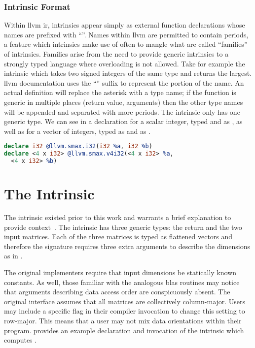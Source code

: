 \documentclass[\main/thesis.tex]{subfiles}
\begin{document}
\subsubsection{Intrinsic Format}
Within \gls{llvm} \gls{ir}, \glspl{intrinsic} appear simply as external function declarations whose names are prefixed with ``''.
Names within \gls{llvm} are permitted to contain periods, a feature which \glspl{intrinsic} make use of often to mangle what are called ``families'' of \glspl{intrinsic}.
Families arise from the need to provide generic \glspl{intrinsic} to a strongly typed language where overloading is not allowed.
Take for example the  \gls{intrinsic} which takes two signed integers of the same type and returns the largest.
\Gls{llvm} documentation uses the ``'' suffix to represent the  portion of the name.
An actual definition will replace the asterisk with a type name; if the function is generic in multiple places (return value, arguments) then the other type names will be appended and separated with more periods.
The  \gls{intrinsic} only has one generic type.
We can see in  a declaration for a scalar integer, typed and  as , as well as for a vector of integers, typed as  and  as .

\begin{lstlisting}[caption={[Inrinsic Declarations]A set of basic intrinsic declarations~\autocite{llvmLangref}.},
      label=lst:intrinsics,numbers=none,language=llvm,float]
declare i32 @llvm.smax.i32(i32 %a, i32 %b)
declare <4 x i32> @llvm.smax.v4i32(<4 x i32> %a,
  <4 x i32> %b)
\end{lstlisting}

\section{The \texorpdfstring{}{llvm.matrix.multiply.*} Intrinsic}
The  \gls{intrinsic} existed prior to this work and warrants a brief explanation to provide context~\autocite{llvmLangref}.
The \gls{intrinsic} has three generic types: the return and the two input matrices.
Each of the three matrices is typed as flattened vectors and therefore the signature requires three extra arguments to describe the dimensions as in .

The original implementers require that input dimensions be statically known constants.
As well, those familiar with the analogous \gls{blas} routines may notice that arguments describing data access order are conspicuously absent.
The original interface assumes that all matrices are collectively column-major.
Users may include a specific flag in their compiler invocation to change this setting to row-major.
This means that a user may not mix data orientations within their program.
 provides an example declaration and invocation of the intrinsic which computes .
\end{document}
